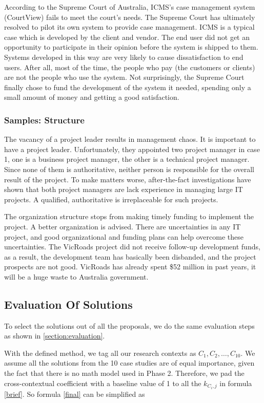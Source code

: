 According to the Supreme Court of Australia, ICMS’s case management system (CourtView) fails to meet the court’s needs. The Supreme Court has ultimately resolved to pilot its own system to provide case management. ICMS is a typical case which is developed by the client and vendor. The end user did not get an opportunity to participate in their opinion before the system is shipped to them. Systems developed in this way are very likely to cause dissatisfaction to end users. After all, most of the time, the people who pay (the customers or clients) are not the people who use the system. Not surprisingly, the Supreme Court finally chose to fund the development of the system it needed, spending only a small amount of money and getting a good satisfaction.

\subsubsection{Samples: Structure}
The vacancy of a project leader results in management chaos. It is important to have a project leader. Unfortunately, they appointed two project manager in case 1, one is a business project manager, the other is a technical project manager. Since none of them is authoritative, neither person is responsible for the overall result of the project. To make matters worse, after-the-fact investigations have shown that both project managers are lack experience in managing large IT projects. A qualified, authoritative is irreplaceable for such projects.

The organization structure stops from making timely funding to implement the project. A better organization is advised. There are uncertainties in any IT project, and good organizational and funding plans can help overcome these uncertainties. The VicRoads project did not receive follow-up development funds, as a result, the development team has basically been disbanded, and the project prospects are not good. VicRoads has already spent \$52 million in past years, it will be a huge waste to Australia government. 


\subsection{Evaluation Of Solutions}
To select the solutions out of all the proposals, we do the same evaluation steps as shown in \ref{section:evaluation}.

With the defined method, we tag all our research contexts as $C_{1}, C_{2}, \ldots, C_{10}$. We assume all the solutions from the 10 case studies are of equal importance, given the fact that there is no math model used in Phase 2. Therefore, we pad the cross-contextual coefficient with a baseline value of 1 to all the $\mathit{k_{C_{i},j}}$ in formula \ref{brief}. So formula \ref{final} can be simplified as 


